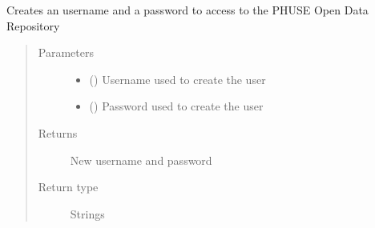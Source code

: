 \documentclass[letterpaper,10pt,english]{sphinxmanual}
\begin{document}

\begin{fulllineitems}
\label{\detokenize{CE_app:CE_app.nihpo_functions.func_nihpo_create_podr_user}}
\sphinxAtStartPar
Creates an username and a password to access to the PHUSE Open Data Repository
\begin{quote}\begin{description}
\item[{Parameters}] \leavevmode\begin{itemize}
\item {} 
\sphinxAtStartPar
{} (\sphinxstyleliteralemphasis{\sphinxupquote{ (}}\sphinxstyleliteralemphasis{\sphinxupquote{, }}\sphinxstyleliteralemphasis{\sphinxupquote{)}}) \textendash{} Username used to create the user

\item {} 
\sphinxAtStartPar
{} (\sphinxstyleliteralemphasis{\sphinxupquote{ (}}\sphinxstyleliteralemphasis{\sphinxupquote{, }}\sphinxstyleliteralemphasis{\sphinxupquote{)}}) \textendash{} Password used to create the user

\end{itemize}

\item[{Returns}] \leavevmode
\sphinxAtStartPar
New username and password

\item[{Return type}] \leavevmode
{} Strings

\end{description}\end{quote}

\end{fulllineitems}
\end{document}
